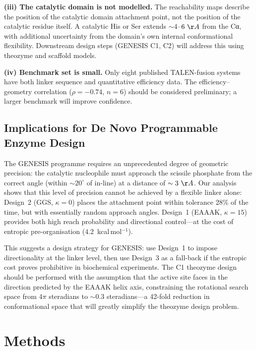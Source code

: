 \documentclass[11pt,a4paper]{article}
\newcommand{\angstrom}{\AA}
\newcommand{\kcal}{kcal\,mol$^{-1}$}
\begin{document}
\textbf{(iii) The catalytic domain is not modelled.} The reachability maps describe the
position of the catalytic domain attachment point, not the position of the catalytic residue
itself. A catalytic His or Ser extends $\sim 4$--$6~\angstrom$ from the Cα, with additional
uncertainty from the domain's own internal conformational flexibility. Downstream design
steps (GENESIS C1, C2) will address this using theozyme and scaffold models.

\textbf{(iv) Benchmark set is small.} Only eight published TALEN-fusion systems have both
linker sequence and quantitative efficiency data. The efficiency--geometry correlation
($\rho = -0.74$, $n = 6$) should be considered preliminary; a larger benchmark will
improve confidence.

\subsection{Implications for De Novo Programmable Enzyme Design}

The GENESIS programme requires an unprecedented degree of geometric precision: the
catalytic nucleophile must approach the scissile phosphate from the correct angle
(within $\sim 20^\circ$ of in-line) at a distance of $\sim 3~\angstrom$. Our analysis
shows that this level of precision cannot be achieved by a flexible linker alone:
Design~2 (GGS, $\kappa = 0$) places the attachment point within tolerance 28\%
of the time, but with essentially random approach angles. Design~1 (EAAAK,
$\kappa = 15$) provides both high reach probability and directional control---at
the cost of entropic pre-organisation ($4.2$~\kcal).

This suggests a design strategy for GENESIS: use Design~1 to impose directionality
at the linker level, then use Design~3 as a fall-back if the entropic cost proves
prohibitive in biochemical experiments. The C1 theozyme design should be performed
with the assumption that the active site faces in the direction predicted by the
EAAAK helix axis, constraining the rotational search space from $4\pi$ steradians
to $\sim 0.3$ steradians---a 42-fold reduction in conformational space that will
greatly simplify the theozyme design problem.

\section{Methods}
\label{sec:methods}
\end{document}
